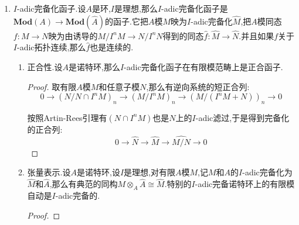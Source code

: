 \begin{enumerate}
\begin{enumerate}[(1)]
\begin{proof}
    		再记$C\subseteq B^n$是由$\cup_{n>0}J_n$生成的$B$子模.按照$B$是诺特环,$B^s$是有限$B$模,说明$C$是有限$B$模,于是$C$可由$\cup_{n>0}J_n$中有限个元生成,记作$C=Bu_1+Bu_2+\cdots+Bu_t$,其中$u_i=(u_{i1},u_{i2},\cdots,u_{is})\in J_{d_i},\forall 1\le i\le t$.记$c=\max\{d_1,d_2,\cdots,d_t\}$.
    		
    		若$n>c$,并且$\eta\in I^nM\cap N$,可记$\eta=\sum_{1\le i\le s}f_i(a_1,a_2,\cdots,a_s)w_i$,其中$(f_1,f_2,\cdots,f_s)\in J_n$.于是有$(f_1,f_2,\cdots,f_s)=\sum_jp_j(X_1,X_2,\cdots,X_s)u_j$,其中$p_j\in B$.按照每个$f_i$是齐次的,于是不妨约定$p_j$是$n-d_j$次齐次的(否则选取适当的齐次分支).于是有:
    		$$\eta=\sum_{1\le i\le s}f_i(a_1,a_2,\cdots,a_r)w_i=\sum_j\sum_{1\le i\le s}p_j(a_1,a_2,\cdots,a_r)u_{ji}(a_1,a_2,\cdots,a_r)w_i$$
    		$$\in\sum_jI^{n-d_j}(I^{d_j}M\cap N)$$
    		
    		最后按照$c\ge d_j$,就有$\eta\in\sum_jI^{n-d_j}(I^{d_j}M\cap N)\subset_j(I^{n-c}(I^{c-d_j}(I^{d_j}M\cap N)))\subseteq I^{n-c}(I^cM\cap N)$.完成证明.
    	\end{proof}
    \end{enumerate}
    \item $I$-adic完备化函子.设$A$是环,$I$是理想,那么$I$-adic完备化函子是$\textbf{Mod}(A)\to\textbf{Mod}(\widehat{A})$的函子.它把$A$模$M$映为$I$-adic完备化$\widehat{M}$,把$A$模同态$f:M\to N$映为由诱导的$M/I^nM\to N/I^nN$得到的同态$\widehat{f}:\widehat{M}\to\widehat{N}$.并且如果$f$关于$I$-adic拓扑连续,那么$\widehat{f}$也是连续的.
    \begin{enumerate}[(1)]
    	\item 正合性.设$A$是诺特环,那么$I$-adic完备化函子在有限模范畴上是正合函子.
    	\begin{proof}
    		
    		取有限$A$模$M$和任意子模$N$,那么有逆向系统的短正合列:
    		$$0\to(N/N\cap I^nM)_n\to(M/I^nM)_n\to(M/(I^nM+N))_n\to0$$
    		
    		按照Artin-Rees引理有$(N\cap I^nM)$也是$N$上的$I$-adic滤过,于是得到完备化的正合列:
    		$$0\to\widehat{N}\to\widehat{M}\to\widehat{M/N}\to0$$
    	\end{proof}
    	\item 张量表示.设$A$是诺特环,设$I$是理想,对有限$A$模$M$,记$M$和$A$的$I$-adic完备化为$\widehat{M}$和$\widehat{A}$,那么有典范的同构$M\otimes_A\widehat{A}\cong\widehat{M}$.特别的$I$-adic完备诺特环上的有限模自动是$I$-adic完备的.
    	\begin{proof}
    		

\end{proof}
\end{enumerate}
\end{enumerate}
